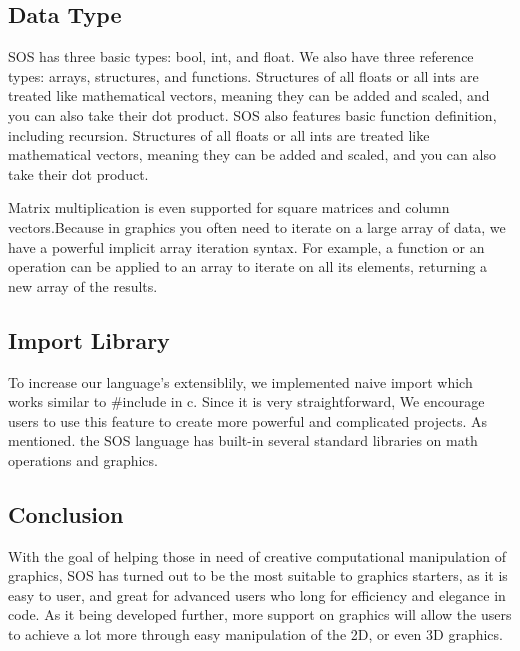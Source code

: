 \documentclass[main.tex]{subfiles}
\begin{document}
	\subsection{Data Type}
	SOS has three basic types: bool, int, and float. We also have three reference types: arrays, structures, and functions.
	Structures of all floats or all ints are treated like mathematical vectors, meaning they can be added and scaled, and you can also take their dot product. 
    SOS also features basic function definition, including recursion.
    Structures of all floats or all ints are treated like mathematical vectors, meaning they can be added and scaled, and you can also take their dot product. 
    
    Matrix multiplication is even supported for square matrices and column vectors.Because in graphics you often need to iterate on a large array of data, we have a powerful implicit array iteration syntax. For example, a function or an operation can be applied to an array to iterate on all its elements, returning a new array of the results.

    \subsection{Import Library}
     To increase our language’s extensiblily, we implemented naive import which works similar to \#include in c. Since it is very straightforward, We encourage users to use this feature to create more powerful and complicated projects. As mentioned. the SOS language has built-in several standard libraries on math operations and graphics.

    \subsection{Conclusion}
    With the goal of helping those in need of creative computational manipulation of graphics, SOS has turned out to be the most suitable to graphics starters, as it is easy to user, and great for advanced users who long for efficiency and elegance in code. As it being developed further, more support on graphics will allow the users to achieve a lot more through easy manipulation of the 2D, or even 3D graphics.

	
\end{document}
